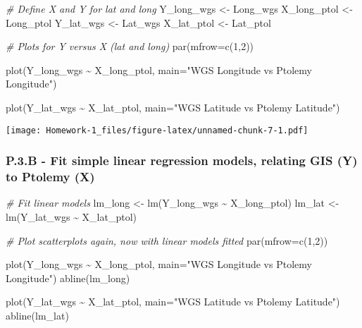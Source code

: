 \documentclass[
]{article}
\newenvironment{Shaded}{\begin{snugshade}}{\end{snugshade}}
\newcommand{\AttributeTok}[1]{\textcolor[rgb]{0.77,0.63,0.00}{#1}}
\newcommand{\CommentTok}[1]{\textcolor[rgb]{0.56,0.35,0.01}{\textit{#1}}}
\newcommand{\DecValTok}[1]{\textcolor[rgb]{0.00,0.00,0.81}{#1}}
\newcommand{\FunctionTok}[1]{\textcolor[rgb]{0.00,0.00,0.00}{#1}}
\newcommand{\NormalTok}[1]{#1}
\newcommand{\OtherTok}[1]{\textcolor[rgb]{0.56,0.35,0.01}{#1}}
\newcommand{\SpecialCharTok}[1]{\textcolor[rgb]{0.00,0.00,0.00}{#1}}
\newcommand{\StringTok}[1]{\textcolor[rgb]{0.31,0.60,0.02}{#1}}
\begin{document}
\begin{Shaded}
\begin{Highlighting}[]
\CommentTok{\# Define X and Y for lat and long}
\NormalTok{Y\_long\_wgs }\OtherTok{\textless{}{-}}\NormalTok{ Long\_wgs}
\NormalTok{X\_long\_ptol }\OtherTok{\textless{}{-}}\NormalTok{ Long\_ptol}
\NormalTok{Y\_lat\_wgs }\OtherTok{\textless{}{-}}\NormalTok{ Lat\_wgs}
\NormalTok{X\_lat\_ptol }\OtherTok{\textless{}{-}}\NormalTok{ Lat\_ptol}

\CommentTok{\# Plots for Y versus X (lat and long)}
\FunctionTok{par}\NormalTok{(}\AttributeTok{mfrow=}\FunctionTok{c}\NormalTok{(}\DecValTok{1}\NormalTok{,}\DecValTok{2}\NormalTok{))}

\FunctionTok{plot}\NormalTok{(Y\_long\_wgs }\SpecialCharTok{\textasciitilde{}}\NormalTok{ X\_long\_ptol, }\AttributeTok{main=}\StringTok{"WGS Longitude vs Ptolemy Longitude"}\NormalTok{)}

\FunctionTok{plot}\NormalTok{(Y\_lat\_wgs }\SpecialCharTok{\textasciitilde{}}\NormalTok{ X\_lat\_ptol, }\AttributeTok{main=}\StringTok{"WGS Latitude vs Ptolemy Latitude"}\NormalTok{)}
\end{Highlighting}
\end{Shaded}

\texttt{[image: Homework-1\_files/figure-latex/unnamed-chunk-7-1.pdf]}

\hypertarget{p.3.b---fit-simple-linear-regression-models-relating-gis-y-to-ptolemy-x}{%
\subsubsection{P.3.B - Fit simple linear regression models, relating GIS
(Y) to Ptolemy
(X)}\label{p.3.b---fit-simple-linear-regression-models-relating-gis-y-to-ptolemy-x}}

\begin{Shaded}
\begin{Highlighting}[]
\CommentTok{\# Fit linear models}
\NormalTok{lm\_long }\OtherTok{\textless{}{-}} \FunctionTok{lm}\NormalTok{(Y\_long\_wgs }\SpecialCharTok{\textasciitilde{}}\NormalTok{ X\_long\_ptol)}
\NormalTok{lm\_lat }\OtherTok{\textless{}{-}} \FunctionTok{lm}\NormalTok{(Y\_lat\_wgs }\SpecialCharTok{\textasciitilde{}}\NormalTok{ X\_lat\_ptol)}

\CommentTok{\# Plot scatterplots again, now with linear models fitted}
\FunctionTok{par}\NormalTok{(}\AttributeTok{mfrow=}\FunctionTok{c}\NormalTok{(}\DecValTok{1}\NormalTok{,}\DecValTok{2}\NormalTok{))}

\FunctionTok{plot}\NormalTok{(Y\_long\_wgs }\SpecialCharTok{\textasciitilde{}}\NormalTok{ X\_long\_ptol, }\AttributeTok{main=}\StringTok{"WGS Longitude vs Ptolemy Longitude"}\NormalTok{)}
\FunctionTok{abline}\NormalTok{(lm\_long)}

\FunctionTok{plot}\NormalTok{(Y\_lat\_wgs }\SpecialCharTok{\textasciitilde{}}\NormalTok{ X\_lat\_ptol, }\AttributeTok{main=}\StringTok{"WGS Latitude vs Ptolemy Latitude"}\NormalTok{)}
\FunctionTok{abline}\NormalTok{(lm\_lat)}
\end{Highlighting}
\end{Shaded}
\end{document}
